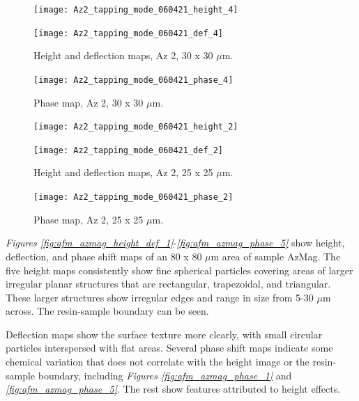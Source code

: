 \begin{figure}[H]
\centering
\begin{minipage}{.45\textwidth}
  \centering
  \texttt{[image: Az2\_tapping\_mode\_060421\_height\_4]}
\end{minipage}
\begin{minipage}{.45\textwidth}
  \centering
  \texttt{[image: Az2\_tapping\_mode\_060421\_def\_4]}
\end{minipage}
\caption[Height and deflection maps, Az 2]{Height and deflection maps, Az 2, 30 x 30 $\mu$m.}
\label{fig:afm_az2_height_def_3}
\end{figure}

\begin{figure}[H]
\centering
  \texttt{[image: Az2\_tapping\_mode\_060421\_phase\_4]}
\caption[Phase map, Az 2]{Phase map, Az 2, 30 x 30 $\mu$m.}
\label{fig:afm_az2_phase_3}
\end{figure}



\begin{figure}[H]
\centering
\begin{minipage}{.45\textwidth}
  \centering
  \texttt{[image: Az2\_tapping\_mode\_060421\_height\_2]}
\end{minipage}
\begin{minipage}{.45\textwidth}
  \centering
  \texttt{[image: Az2\_tapping\_mode\_060421\_def\_2]}
\end{minipage}
\caption[Height and deflection maps, Az 2]{Height and deflection maps, Az 2, 25 x 25 $\mu$m.}
\label{fig:afm_az2_height_def_4}
\end{figure}


\begin{figure}[H]
\centering
  \texttt{[image: Az2\_tapping\_mode\_060421\_phase\_2]}
\caption[Phase map, Az 2]{Phase map, Az 2, 25 x 25 $\mu$m.}
\label{fig:afm_az2_phase_4}
\end{figure}



\textit{Figures \ref{fig:afm_azmag_height_def_1}}-\textit{\ref{fig:afm_azmag_phase_5}} show height, deflection, and phase shift maps of an 80 x 80 $\mu$m area of sample AzMag. The five height maps consistently show fine spherical particles covering areas of larger irregular planar structures that are rectangular, trapezoidal, and triangular. These larger structures show irregular edges and range in size from 5-30 $\mu$m across. The resin-sample boundary can be seen.

Deflection maps show the surface texture more clearly, with small circular particles interspersed with flat areas. Several phase shift maps indicate some chemical variation that does not correlate with the height image or the resin-sample boundary, including \textit{Figures \ref{fig:afm_azmag_phase_1}} and \textit{\ref{fig:afm_azmag_phase_5}}. The rest show features attributed to height effects.

